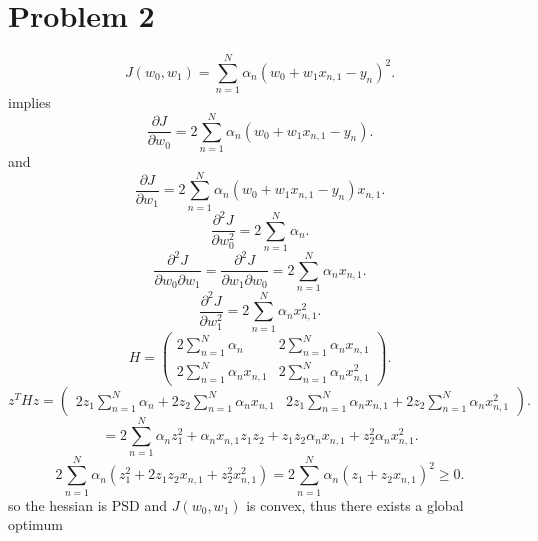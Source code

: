 \documentclass[11pt]{article}
\newcommand{\solution}[1]{{{\color{blue}{\bf Solution:} {#1}}}}
\begin{document}
\section{Problem 2}
\solution{
    \[
        J(w_0,w_1) = \sum_{n=1}^{N}\alpha_n(w_0 + w_1x_{n,1}-y_n)^2
    .\] 
    implies
    \[
        \frac{\partial J}{\partial w_0} = 2\sum_{n=1}^{N}\alpha_n(w_0+w_1x_{n,1}-y_n)
    .\] 
    and
    \[
        \frac{\partial J}{\partial w_1} = 2\sum_{n=1}^{N}\alpha_n(w_0+w_1x_{n,1}-y_n)x_{n,1}
    .\] 
    \[
        \frac{\partial^2 J}{\partial w_0^2} = 2 \sum_{n=1}^{N}\alpha_n
    .\] 
    \[
        \frac{\partial^2 J}{\partial w_0 \partial w_1} = \frac{\partial^2 J}{\partial w_1 \partial w_0} = 2\sum_{n=1}^{N}\alpha_nx_{n,1}
    .\] 
    \[
        \frac{\partial^2 J}{\partial w_1^2} = 2\sum_{n=1}^{N}\alpha_n x_{n,1}^2
    .\] 
    \[
    H = \begin{pmatrix} 
        2\sum_{n=1}^{N}\alpha_n & 2\sum_{n=1}^{N}\alpha_nx_{n,1}\\
        2\sum_{n=1}^{N}\alpha_nx_{n,1} & 2\sum_{n=1}^{N}\alpha_nx_{n,1}^2
    \end{pmatrix} 
    .\] 
    \[
        z^{T}Hz = \begin{pmatrix} 2z_1\sum_{n=1}^{N}\alpha_n + 2z_2\sum_{n=1}^{N}\alpha_nx_{n,1} & 2z_1\sum_{n=1}^{N}\alpha_nx_{n,1} + 2z_2\sum_{n=1}^{N}\alpha_nx_{n,1}^2 \end{pmatrix} 
    .\] 
    \[
        = 2\sum_{n=1}^{N}\alpha_nz_1^2 + \alpha_nx_{n,1}z_1z_2 + z_1z_2\alpha_nx_{n,1} + z_2^2\alpha_nx_{n,1}^2
    .\] 
    \[
        2\sum_{n=1}^{N}\alpha_n(z_1^2 + 2z_1z_2x_{n,1} + z_2^2x_{n,1}^2) = 2\sum_{n=1}^{N}\alpha_n(z_1+z_2x_{n,1})^2 \ge 0
    .\] 
    so the hessian is PSD and $J(w_0,w_1)$ is convex, thus there exists a global optimum
}
\end{document}
